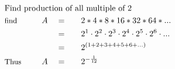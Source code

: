 \begin{alignat*}{5}
&\rlap{\text{Find production of all multiple of 2}}\\
&\small\text{find}\normalsize\qquad&A\quad&=\quad&&2*4*8*16*32*64*...\\
&\,&\,&=&&2^1\cdot2^2\cdot2^3\cdot2^4\cdot2^5\cdot2^6\cdot...\\
&\,&\,&=&&2^{(1+2+3+4+5+6+...)}\\
&\small\text{Thus}&A\quad&=&&2^{-\frac{1}{12}}
\end{alignat*}
